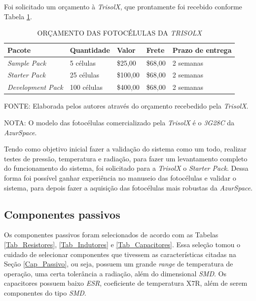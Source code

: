 \documentclass[
	12pt,				%
	openright,			%
	oneside,			%
	a4paper,			%
	english,			%
	french,				%
	spanish,			%
	brazil,				%
	oldfontcommands
	]{abntex2}
\begin{document}
	Foi solicitado um orçamento à \textit{TrisolX}, que prontamente foi recebido conforme Tabela \ref{Tab_Orc_TrisolX}.
	
	\begin{table}[th]
	\caption{ORÇAMENTO DAS FOTOCÉLULAS DA \textit{TRISOLX}}
	\label{Tab_Orc_TrisolX}
	\centering
	\begin{tabular}{p{3.5cm}|p{2.5cm}|p{1.5cm}|p{1.5cm}|p{2.0cm}}
		\textbf{Pacote} & \textbf{Quantidade} & \textbf{Valor} & \textbf{Frete} & \textbf{Prazo de entrega}\\
		\hline
		\textit{Sample Pack} & 5 células & \$25,00 &  \$68,00 & 2 semanas\\
		\textit{Starter Pack} & 25 células & \$100,00 &  \$68,00 & 2 semanas\\
		\textit{Development Pack} & 100 células & \$400,00 & \$68,00 & 2 semanas\\
	\end{tabular}
	
	\begin{small}
	\vspace{3pt}
		FONTE: Elaborada pelos autores através do orçamento recebedido pela \textit{TrisolX}.
	\end{small}
	
	\begin{footnotesize}
		NOTA: O modelo das fotocélulas comercializado pela \textit{TrisolX} é o \textit{3G28C} da \textit{AzurSpace}.
	\end{footnotesize}
	\end{table}	
	
	Tendo como objetivo inicial fazer a validação do sistema como um todo, realizar testes de pressão, temperatura e radiação, para fazer um levantamento completo do funcionamento do sistema, foi solicitado para a \textit{TrisolX} o \textit{Starter Pack}. Dessa forma foi possível ganhar experiência no manuseio das fotocélulas e validar o sistema, para depois fazer a aquisição das fotocélulas mais robustas da \textit{AzurSpace}.
	
\subsection[Componentes passivos]{Componentes passivos}
	
	Os componentes passivos foram selecionados de acordo com as Tabelas \ref{Tab_Resistores}, \ref{Tab_Indutores} e \ref{Tab_Capacitores}. Essa seleção tomou o cuidado de selecionar componentes que tivessem as características citadas na Seção \ref{Cap_Passivo}, ou seja, possuem um grande \textit{range} de temperatura de operação, uma certa tolerância a radiação, além do dimensional \textit{SMD}. Os capacitores possuem baixo \textit{ESR}, coeficiente de temperatura X7R, além de serem componentes do tipo \textit{SMD}.
	
\end{document}
